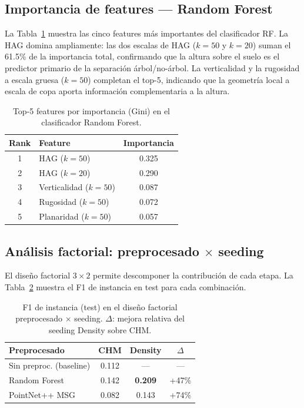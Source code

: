 \documentclass[runningheads]{llncs}
\begin{document}
\subsection{Importancia de features --- Random Forest}

La Tabla~\ref{tab:rf-importance} muestra las cinco features m\'as importantes del clasificador RF. La HAG domina ampliamente: las dos escalas de HAG ($k\!=\!50$ y $k\!=\!20$) suman el 61.5\% de la importancia total, confirmando que la altura sobre el suelo es el predictor primario de la separaci\'on \'arbol/no-\'arbol. La verticalidad y la rugosidad a escala gruesa ($k\!=\!50$) completan el top-5, indicando que la geometr\'ia local a escala de copa aporta informaci\'on complementaria a la altura.

\begin{table}[t]
\centering
\caption{Top-5 features por importancia (Gini) en el clasificador Random Forest.}\label{tab:rf-importance}
\begin{tabular}{clc}
\toprule
Rank & Feature & Importancia \\
\midrule
1 & HAG ($k\!=\!50$)           & 0.325 \\
2 & HAG ($k\!=\!20$)           & 0.290 \\
3 & Verticalidad ($k\!=\!50$)  & 0.087 \\
4 & Rugosidad ($k\!=\!50$)     & 0.072 \\
5 & Planaridad ($k\!=\!50$)    & 0.057 \\
\bottomrule
\end{tabular}
\end{table}

\subsection{An\'alisis factorial: preprocesado $\times$ seeding}

El dise\~no factorial $3 \times 2$ permite descomponer la contribuci\'on de cada etapa. La Tabla~\ref{tab:factorial} muestra el F1 de instancia en test para cada combinaci\'on.

\begin{table}[t]
\centering
\caption{F1 de instancia (test) en el dise\~no factorial preprocesado $\times$ seeding. $\Delta$: mejora relativa del seeding Density sobre CHM.}\label{tab:factorial}
\begin{tabular}{lccc}
\toprule
Preprocesado & CHM & Density & $\Delta$ \\
\midrule
Sin preproc. (baseline) & 0.112 & ---   & ---   \\
Random Forest           & 0.142 & \textbf{0.209} & +47\% \\
PointNet++ MSG          & 0.082 & 0.143 & +74\% \\
\bottomrule
\end{tabular}
\end{table}
\end{document}
